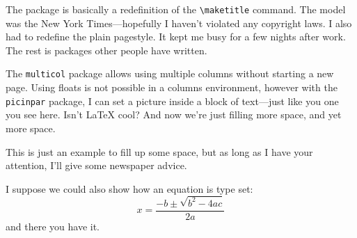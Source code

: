\documentclass{article}
\date{June 20th 1995}
\begin{document}
\maketitle

\begin{multicols}{2}


The package is basically a redefinition of the \verb+\maketitle+ command.  The model was the New York Times---hopefully I haven't violated any copyright laws.  I also had to redefine the plain pagestyle.  It kept me busy for a few nights after work.  The rest is packages other people have written.      

\begin{window} The \verb+multicol+ package allows using multiple columns without starting a new page.  Using floats is not possible in a columns environment, however with the \verb+picinpar+ package, I can set a picture inside a block of text---just like you one you see here.  Isn't \LaTeX{} cool?
And now we're just filling more space, and yet more space.  
\end{window}
\closearticle


This is just an example to fill up some space, but as long as I have your attention, I'll give some newspaper advice.

I suppose we could also show how an equation is type set:
\begin{displaymath}
x=\frac{-b\pm\sqrt{b^2-4ac}}{2a}
\end{displaymath}
and there you have it.  

\lipsum[1-4]

\closearticle

\end{multicols}
\end{document}
